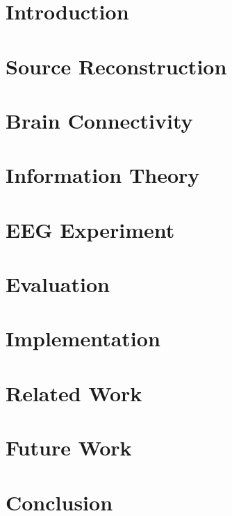 \documentclass[master=mai, masteroption=ecs]{kulemt}
\begin{document}
\listoffigures

\mainmatter

\chapter{Introduction}


\chapter{Source Reconstruction}\label{source-reconstruction}


\chapter{Brain Connectivity}\label{connectivity}


\chapter{Information Theory}\label{information-theory}


\chapter{EEG Experiment}\label{eeg-experiment}


\chapter{Evaluation}\label{evaluation}


\chapter{Implementation}\label{implementation}


\chapter{Related Work}\label{related}


\chapter{Future Work}\label{future-work}


\chapter{Conclusion}\label{conclusion}



\backmatter



\nocite{*}
\end{document}

